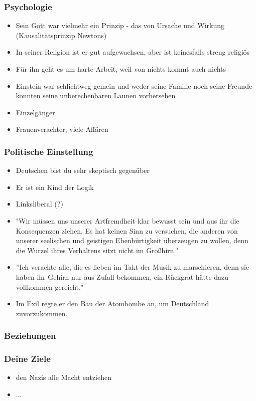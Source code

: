 \documentclass[12pt, a4paper, openany]{report}
\begin{document}
\subsubsection{Psychologie}
\begin{itemize}
\item Sein Gott war vielmehr ein Prinzip - das von Ursache und Wirkung (Kausalitätsprinzip Newtons)
\item In seiner Religion ist er gut aufgewachsen, aber ist keinesfalls streng religiös
\item Für ihn geht es um harte Arbeit, weil von nichts kommt auch nichts
\item Einstein war schlichtweg gemein und weder seine Familie noch seine Freunde konnten seine unberechenbaren Launen vorhersehen
\item Einzelgänger
\item Frauenverachter, viele Affären
\end{itemize}


\subsubsection{Politische Einstellung}
\begin{itemize}
\item Deutschen bist du sehr skeptisch gegenüber
\item Er ist ein Kind der Logik 
\item Linksliberal (?)
\item "Wir müssen uns unserer Artfremdheit klar bewusst sein und aus ihr die Konsequenzen ziehen. Es hat keinen Sinn zu versuchen, die anderen von unserer seelischen und geistigen Ebenbürtigkeit überzeugen zu wollen, denn die Wurzel ihres Verhaltens sitzt nicht im Großhirn."
\item ''Ich verachte alle, die es lieben im Takt der Musik zu marschieren, denn sie haben ihr Gehirn nur aus Zufall bekommen, ein Rückgrat hätte dazu vollkommen gereicht."
\item Im Exil regte er den Bau der Atombombe an, um Deutschland zuvorzukommen.
\end{itemize}

\subsubsection{Beziehungen}
\subsubsection{Deine Ziele}
\begin{itemize}
\item den Nazis alle Macht entziehen
\item ...
\end{itemize}
\end{document}
